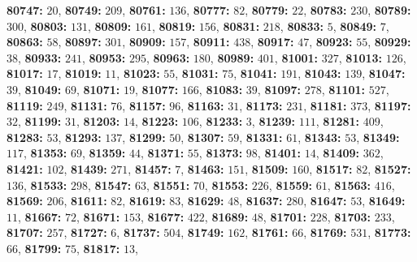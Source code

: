 \textsf{\bfseries 80747:} $20$, \textsf{\bfseries 80749:} $209$, \textsf{\bfseries 80761:} $136$, \textsf{\bfseries 80777:} $82$, \textsf{\bfseries 80779:} $22$, \textsf{\bfseries 80783:} $230$, \textsf{\bfseries 80789:} $300$, \textsf{\bfseries 80803:} $131$, \textsf{\bfseries 80809:} $161$, \textsf{\bfseries 80819:} $156$, \textsf{\bfseries 80831:} $218$, \textsf{\bfseries 80833:} $5$, \textsf{\bfseries 80849:} $7$, \textsf{\bfseries 80863:} $58$, \textsf{\bfseries 80897:} $301$, \textsf{\bfseries 80909:} $157$, \textsf{\bfseries 80911:} $438$, \textsf{\bfseries 80917:} $47$, \textsf{\bfseries 80923:} $55$, \textsf{\bfseries 80929:} $38$, \textsf{\bfseries 80933:} $241$, \textsf{\bfseries 80953:} $295$, \textsf{\bfseries 80963:} $180$, \textsf{\bfseries 80989:} $401$, \textsf{\bfseries 81001:} $327$, \textsf{\bfseries 81013:} $126$, \textsf{\bfseries 81017:} $17$, \textsf{\bfseries 81019:} $11$, \textsf{\bfseries 81023:} $55$, \textsf{\bfseries 81031:} $75$, \textsf{\bfseries 81041:} $191$, \textsf{\bfseries 81043:} $139$, \textsf{\bfseries 81047:} $39$, \textsf{\bfseries 81049:} $69$, \textsf{\bfseries 81071:} $19$, \textsf{\bfseries 81077:} $166$, \textsf{\bfseries 81083:} $39$, \textsf{\bfseries 81097:} $278$, \textsf{\bfseries 81101:} $527$, \textsf{\bfseries 81119:} $249$, \textsf{\bfseries 81131:} $76$, \textsf{\bfseries 81157:} $96$, \textsf{\bfseries 81163:} $31$, \textsf{\bfseries 81173:} $231$, \textsf{\bfseries 81181:} $373$, \textsf{\bfseries 81197:} $32$, \textsf{\bfseries 81199:} $31$, \textsf{\bfseries 81203:} $14$, \textsf{\bfseries 81223:} $106$, \textsf{\bfseries 81233:} $3$, \textsf{\bfseries 81239:} $111$, \textsf{\bfseries 81281:} $409$, \textsf{\bfseries 81283:} $53$, \textsf{\bfseries 81293:} $137$, \textsf{\bfseries 81299:} $50$, \textsf{\bfseries 81307:} $59$, \textsf{\bfseries 81331:} $61$, \textsf{\bfseries 81343:} $53$, \textsf{\bfseries 81349:} $117$, \textsf{\bfseries 81353:} $69$, \textsf{\bfseries 81359:} $44$, \textsf{\bfseries 81371:} $55$, \textsf{\bfseries 81373:} $98$, \textsf{\bfseries 81401:} $14$, \textsf{\bfseries 81409:} $362$, \textsf{\bfseries 81421:} $102$, \textsf{\bfseries 81439:} $271$, \textsf{\bfseries 81457:} $7$, \textsf{\bfseries 81463:} $151$, \textsf{\bfseries 81509:} $160$, \textsf{\bfseries 81517:} $82$, \textsf{\bfseries 81527:} $136$, \textsf{\bfseries 81533:} $298$, \textsf{\bfseries 81547:} $63$, \textsf{\bfseries 81551:} $70$, \textsf{\bfseries 81553:} $226$, \textsf{\bfseries 81559:} $61$, \textsf{\bfseries 81563:} $416$, \textsf{\bfseries 81569:} $206$, \textsf{\bfseries 81611:} $82$, \textsf{\bfseries 81619:} $83$, \textsf{\bfseries 81629:} $48$, \textsf{\bfseries 81637:} $280$, \textsf{\bfseries 81647:} $53$, \textsf{\bfseries 81649:} $11$, \textsf{\bfseries 81667:} $72$, \textsf{\bfseries 81671:} $153$, \textsf{\bfseries 81677:} $422$, \textsf{\bfseries 81689:} $48$, \textsf{\bfseries 81701:} $228$, \textsf{\bfseries 81703:} $233$, \textsf{\bfseries 81707:} $257$, \textsf{\bfseries 81727:} $6$, \textsf{\bfseries 81737:} $504$, \textsf{\bfseries 81749:} $162$, \textsf{\bfseries 81761:} $66$, \textsf{\bfseries 81769:} $531$, \textsf{\bfseries 81773:} $66$, \textsf{\bfseries 81799:} $75$, \textsf{\bfseries 81817:} $13$, 
